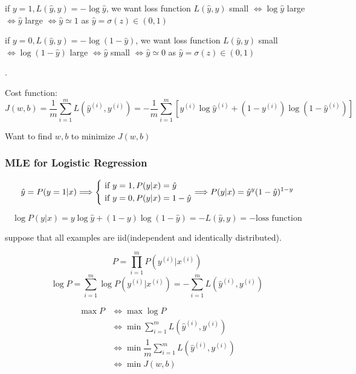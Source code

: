 if $y = 1, L(\hat{y}, y) = - \log \hat{y}$,
we want loss function $L(\hat{y}, y)$ small $\Leftrightarrow \log \hat{y}$ large $\Leftrightarrow \hat{y}$ large $\Leftrightarrow \hat{y} \simeq 1$ as $\hat{y} = \sigma(z) \in (0, 1)$

if $y = 0, L(\hat{y}, y) = - \log (1 - \hat{y})$,
we want loss function $L(\hat{y}, y)$ small $\Leftrightarrow \log (1 - \hat{y})$ large $\Leftrightarrow \hat{y}$ small $\Leftrightarrow \hat{y} \simeq 0$ as $\hat{y} = \sigma(z) \in (0, 1)$


.

Cost function:
$$
J(w, b)
=   \dfrac{1}{m} \sum_{i = 1}^m L(\hat{y}^{(i)}, y^{(i)})
= - \dfrac{1}{m} \sum_{i = 1}^m [y^{(i)} \log \hat{y}^{(i)} + (1 - y^{(i)}) \log (1 - \hat{y}^{(i)})]
$$

Want to find $w, b$ to minimize $J(w, b)$

\subsubsection{MLE for Logistic Regression}
$$
\hat{y} = P(y = 1 | x)
\Longrightarrow
\left\{
	\begin{aligned}
		& \textrm{\ if } y = 1, P(y|x) = \hat{y} \\
		& \textrm{\ if } y = 0, P(y|x) = 1 - \hat{y}
	\end{aligned}
\right.
\Longrightarrow
P(y|x) = \hat{y}^y (1 - \hat{y})^{1 - y}
$$

$$ \log P(y|x) = y \log \hat{y} + (1 - y) \log (1 - \hat{y}) = - L(\hat{y}, y) = - \text{loss function} $$

suppose that all examples are iid(independent and identically distributed).

$$P = \prod_{i = 1}^m P(y^{(i)} | x^{(i)})$$
$$\log P = \sum_{i = 1}^m \log P(y^{(i)} | x^{(i)}) = - \sum_{i = 1}^m L(\hat{y}^{(i)}, y^{(i)})$$

$$
\begin{aligned}
\max P & \Longleftrightarrow \max \log P \\
	   & \Longleftrightarrow \min \sum_{i = 1}^m L(\hat{y}^{(i)}, y^{(i)}) \\
	   & \Longleftrightarrow \min \dfrac{1}{m} \sum_{i = 1}^m L(\hat{y}^{(i)}, y^{(i)}) \\
	   & \Longleftrightarrow \min J(w, b)
\end{aligned}
$$

